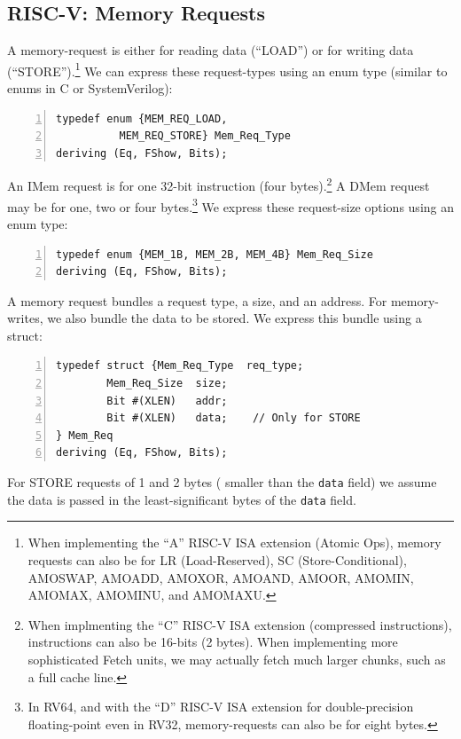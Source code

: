 \subsection{RISC-V: Memory Requests}


A memory-request is either for reading data (``LOAD'') or for writing
data (``STORE'').\footnote{When implementing the ``A'' RISC-V ISA
extension (Atomic Ops), memory requests can also be for LR
(Load-Reserved), SC (Store-Conditional), AMOSWAP, AMOADD, AMOXOR,
AMOAND, AMOOR, AMOMIN, AMOMAX, AMOMINU, and AMOMAXU.}  We can express
these request-types using an enum type (similar to enums in C or
SystemVerilog):

\begin{Verbatim}[frame=single, numbers=left]
typedef enum {MEM_REQ_LOAD,
	      MEM_REQ_STORE} Mem_Req_Type
deriving (Eq, FShow, Bits);
\end{Verbatim}

An IMem request is for one 32-bit instruction (four
bytes).\footnote{When implmenting the ``C'' RISC-V ISA extension
(compressed instructions), instructions can also be 16-bits (2 bytes).
When implementing more sophisticated Fetch units, we may actually
fetch much larger chunks, such as a full cache line.}  A DMem request
may be for one, two or four bytes.\footnote{In RV64, and with the
``D'' RISC-V ISA extension for double-precision floating-point even in
RV32, memory-requests can also be for eight bytes.}  We express these
request-size options using an enum type:

\begin{Verbatim}[frame=single, numbers=left]
typedef enum {MEM_1B, MEM_2B, MEM_4B} Mem_Req_Size
deriving (Eq, FShow, Bits);
\end{Verbatim}

A memory request bundles a request type, a size, and an address.  For
memory-writes, we also bundle the data to be stored.  We express this
bundle using a struct:

\begin{Verbatim}[frame=single, numbers=left]
typedef struct {Mem_Req_Type  req_type;
		Mem_Req_Size  size;
		Bit #(XLEN)   addr;
		Bit #(XLEN)   data;    // Only for STORE
} Mem_Req
deriving (Eq, FShow, Bits);
\end{Verbatim}

For STORE requests of 1 and 2 bytes ({\ie} smaller than the \verb|data|
field) we assume the data is passed in the least-significant bytes of
the \verb|data| field.

